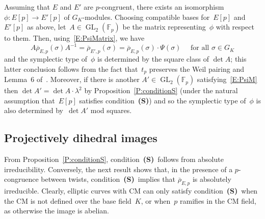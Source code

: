 \documentclass[twoside,leqno,symbols-for-thanks, draft]{rmi}
\numberwithin{equation}{section}
\newcommand{\condS}{condition~{\bf (S)}}
\newcommand{\Fp}{\mathbb{F}_p}
\newcommand{\rhobar}{{\overline{\rho}}}
\newcommand{\GL}{\operatorname{GL}}
\theoremstyle{remark}
\begin{document}
Assuming that $E$ and $E'$ are $p$-congruent, there exists an
isomorphism $\phi : E[p] \to E'[p]$
of $G_K$-modules. 
Choosing
compatible bases for~$E[p]$ and~$E'[p]$ as above, let~$A \in
\GL_2(\Fp)$ be the matrix representing~$\phi$ with respect to them.
Then, using~\eqref{E:PsiMatrix}, we have
\begin{equation}\label{E:PsiM}
A \rhobar_{E,p}(\sigma) A^{-1} = \rhobar_{E',p}(\sigma) =
\rhobar_{E,p}(\sigma) \cdot \Psi(\sigma) \quad \text{ for all } \sigma
\in G_K
\end{equation}
and the 
symplectic type of~$\phi$ is determined by the square class of $\det A$; this latter conclusion follows 
from the fact that~$t_p$ preserves the Weil pairing
and Lemma~6 of~\cite{FKSym}. Moreover, if there is another $A' \in
\GL_2(\Fp)$  satisfying~\eqref{E:PsiM} then $\det A' = \det A \cdot
\lambda^2$ by Proposition~\ref{P:conditionS} (under the natural
assumption that~$E[p]$ satisfies condition~{\bf (S)}) and so the symplectic type of~$\phi$ is also determined by~$\det A'$ mod squares.

\subsection{Projectively dihedral images}
\label{SS:dihedral}
From Proposition~\ref{P:conditionS}, \condS\ follows from
absolute irreducibility.  Conversely, the next result shows that, in
the presence of a $p$-congruence between twists, \condS\
implies that $\rhobar_{E,p}$ is absolutely irreducible.  Clearly,
elliptic curves with CM can only satisfy \condS\ when the
CM is not defined over the base field~$K$, or when~$p$ ramifies in the
CM field, as otherwise the image is abelian.
\end{document}
